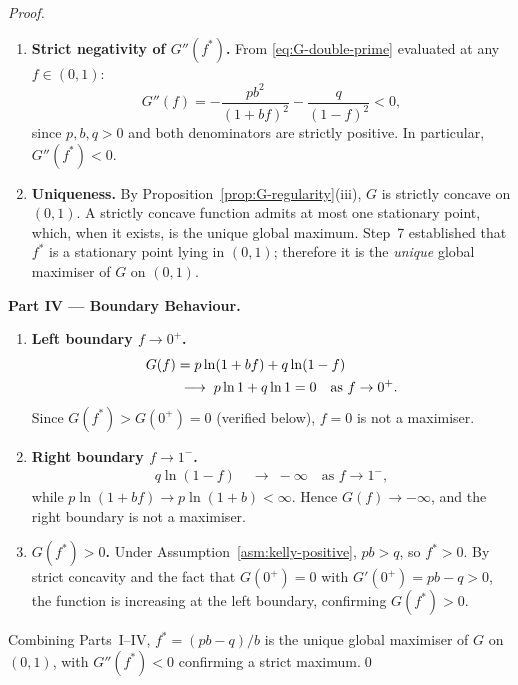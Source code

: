 \documentclass[12pt,openany]{book}
\numberwithin{equation}{chapter}
\theoremstyle{plain}
\theoremstyle{definition}
\theoremstyle{remark}
\numberwithin{equation}{chapter}
\theoremstyle{plain}
\begin{document}
\begin{proof}
\begin{enumerate}[label=\textbf{Step \arabic*.}, leftmargin=*, widest=Step 9,
                  resume]
  \item \textbf{Strict negativity of $G''(f^{*})$.}
        From \eqref{eq:G-double-prime} evaluated at any
        $f \in (0, 1)$:
        \begin{equation}
          G''(f) = -\frac{pb^{2}}{(1 + bf)^{2}}
                   - \frac{q}{(1 - f)^{2}} < 0,
          \label{eq:soc}
        \end{equation}
        since $p, b, q > 0$ and both denominators are strictly
        positive.  In particular, $G''(f^{*}) < 0$.

  \item \textbf{Uniqueness.}
        By Proposition~\ref{prop:G-regularity}(iii), $G$ is strictly
        concave on $(0, 1)$.  A strictly concave function admits at
        most one stationary point, which, when it exists, is the
        unique global maximum.  Step~7 established that $f^{*}$ is a
        stationary point lying in $(0, 1)$; therefore it is the
        \emph{unique} global maximiser of $G$ on $(0, 1)$.

\end{enumerate}

\medskip
\noindent\textbf{Part IV --- Boundary Behaviour.}

\begin{enumerate}[label=\textbf{Step \arabic*.}, leftmargin=*, widest=Step 9,
                  resume]

  \item \textbf{Left boundary $f \to 0^{+}$.}
        \begin{align}
          G(f) &= p\ln(1 + bf) + q\ln(1 - f) \notag \\
               &\;\longrightarrow\; p\ln 1 + q\ln 1 = 0
                  \quad\text{as } f \to 0^{+}. \label{eq:left-bdry}
        \end{align}
        Since $G(f^{*}) > G(0^{+}) = 0$ (verified below), $f = 0$
        is not a maximiser.

  \item \textbf{Right boundary $f \to 1^{-}$.}
        \begin{align}
          q\ln(1 - f) &\;\longrightarrow\; -\infty
            \quad\text{as } f \to 1^{-}, \label{eq:right-bdry}
        \end{align}
        while $p\ln(1 + bf) \to p\ln(1 + b) < \infty$.  Hence
        $G(f) \to -\infty$, and the right boundary is not a maximiser.

  \item \textbf{$G(f^{*}) > 0$.}
        Under Assumption~\ref{asm:kelly-positive}, $pb > q$, so
        $f^{*} > 0$.  By strict concavity and the fact that $G(0^{+})
        = 0$ with $G'(0^{+}) = pb - q > 0$, the function is
        increasing at the left boundary, confirming $G(f^{*}) > 0$.

\end{enumerate}

\noindent Combining Parts~I--IV, $f^{*} = (pb - q)/b$ is the unique
global maximiser of $G$ on $(0, 1)$, with $G''(f^{*}) < 0$
confirming a strict maximum.\qed
\end{proof}
\end{document}
